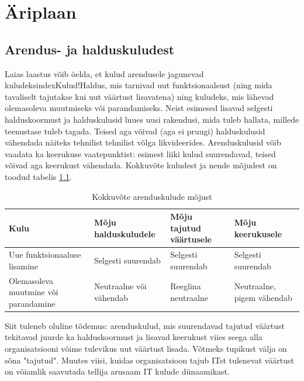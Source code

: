 \chapter{Äriplaan}
\section{Arendus- ja halduskuludest}
\label{sec:kulud}
Laias laastus võib öelda, et kulud arendusele jagunevad kuludeksindex{Kulud!Haldus}, mis tarnivad uut funktsionaalsust (ning mida tavaliselt tajutakse kui uut väärtust lisavatena) ning kuludeks, mis lähevad olemasoleva muutmiseks või parandamiseks. Neist esimesed lisavad selgesti halduskoormust ja halduskulusid luues uusi rakendusi, mida tuleb hallata, millede teenustase tuleb tagada. Teised aga võivad (aga ei pruugi) halduskulusid vähendada näiteks tehnilist tehnilist võlga likvideerides. Arenduskulusid võib vaadata ka keerukuse vaatepunktist: esimest liiki kulud suurendavad, teised võivad aga keerukust vähendada. Kokkuvõte kuludest ja nende mõjudest on toodud tabelis \ref{tab:arendus}.

\begin{table}
	\begin{center}
		\begin{tabular}{p{2.8cm}p{1.7cm}p{1.5cm}p{2cm}}
		\toprule
Kulu & Mõju haldus\-kuludele & Mõju tajutud väärtusele & Mõju \mbox{keerukusele} \\
\midrule

Uue funktsionaaluse \mbox{lisamine} & Selgesti \mbox{suurendab} & Selgesti \mbox{suurendab} & Selgesti \mbox{suurendab} \\
\addlinespace
Olemasoleva muutmine või parandamine & Neutraalne või vähendab & Reeglina \mbox{neutraalne} & Neutraalne, \mbox{pigem} vähendab \\

\bottomrule
		\end{tabular}
		\caption{Kokkuvõte arenduskulude mõjust}
		\label{tab:arendus}
	\end{center}
\end{table}

Siit tuleneb oluline tõdemus: arenduskulud, mis suurendavad tajutud väärtust tekitavad juurde ka halduskoormust ja lisavad keerukust viies seega alla organisatsiooni võime tulevikus uut väärtust lisada. Võtmeks tupikust välja on sõna "tajutud". Muutes viisi, kuidas organisatsioon tajub ITst tulenevat väärtust on võiamlik saavutada tellija arusaam IT kulude dünaamikast.

